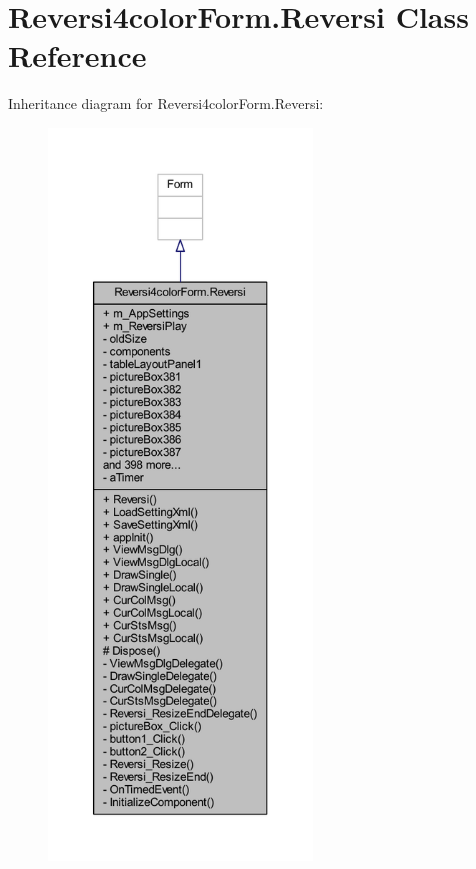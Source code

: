 \hypertarget{class_reversi4color_form_1_1_reversi}{}\section{Reversi4color\+Form.\+Reversi Class Reference}
\label{class_reversi4color_form_1_1_reversi}


Inheritance diagram for Reversi4color\+Form.\+Reversi\+:\nopagebreak
\begin{figure}[H]
\begin{center}
\leavevmode
\includegraphics[height=550pt]{class_reversi4color_form_1_1_reversi__inherit__graph}
\end{center}
\end{figure}


